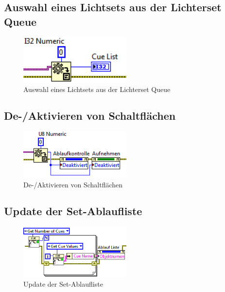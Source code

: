 	\subsection{Auswahl eines Lichtsets aus der Lichterset Queue}
	\begin{figure}[h!]
	\centering
		\includegraphics[width=0.5\textwidth]{Pics/front-auswahl.png}
	\caption{Auswahl eines Lichtsets aus der Lichterset Queue}
	\label{fig:a4}
	\end{figure}
	
	\subsection{De-/Aktivieren von Schaltflächen}	
	\begin{figure}[h!]
	\centering
		\includegraphics[width=0.5\textwidth]{Pics/front-deaktivieren.png}
	\caption{De-/Aktivieren von Schaltflächen}
	\label{fig:a5}
	\end{figure}

	\subsection{Update der Set-Ablaufliste}
	\begin{figure}[h!]
	\centering
		\includegraphics[width=0.5\textwidth]{Pics/front-updateCue.png}
	\caption{Update der Set-Ablaufliste}
	\label{fig:a6}
	\end{figure}
	
